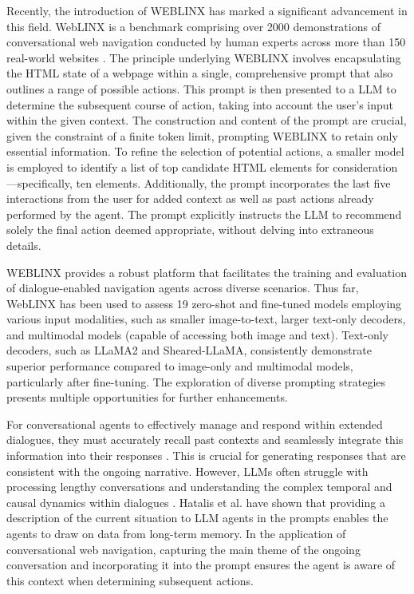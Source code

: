 \documentclass[11pt]{article}
\begin{document}
Recently, the introduction of WEBLINX \cite{lxinghan_2024_weblinx} has marked a significant advancement in this field. WebLINX is a benchmark comprising over 2000 demonstrations of conversational web navigation conducted by human experts across more than 150 real-world websites \cite{lxinghan_2024_weblinx}. The principle underlying WEBLINX involves encapsulating the HTML state of a webpage within a single, comprehensive prompt that also outlines a range of possible actions. This prompt is then presented to a LLM to determine the subsequent course of action, taking into account the user's input within the given context. The construction and content of the prompt are crucial, given the constraint of a finite token limit, prompting WEBLINX to retain only essential information. To refine the selection of potential actions, a smaller model is employed to identify a list of top candidate HTML elements for consideration—specifically, ten elements. Additionally, the prompt incorporates the last five interactions from the user for added context as well as past actions already performed by the agent. The prompt explicitly instructs the LLM to recommend solely the final action deemed appropriate, without delving into extraneous details.

WEBLINX provides a robust platform that facilitates the training and evaluation of dialogue-enabled navigation agents across diverse scenarios. Thus far, WebLINX has been used to assess 19 zero-shot and fine-tuned models employing various input modalities, such as smaller image-to-text, larger text-only decoders, and multimodal models (capable of accessing both image and text). Text-only decoders, such as LLaMA2 and Sheared-LLaMA, consistently demonstrate superior performance compared to image-only and multimodal models, particularly after fine-tuning. The exploration of diverse prompting strategies presents multiple opportunities for further enhancements.

For conversational agents to effectively manage and respond within extended dialogues, they must accurately recall past contexts and seamlessly integrate this information into their responses \cite{Evaluating_Very_Long_Term_Conversational_Memory}. This is crucial for generating responses that are consistent with the ongoing narrative. However, LLMs often struggle with processing lengthy conversations and understanding the complex temporal and causal dynamics within dialogues \cite{Evaluating_Very_Long_Term_Conversational_Memory}. Hatalis et al. \cite{hatalis_2023_memory_matters} have shown that providing a description of the current situation to LLM agents in the prompts enables the agents to draw on data from long-term memory. In the application of conversational web navigation, capturing the main theme of the ongoing conversation and incorporating it into the prompt ensures the agent is aware of this context when determining subsequent actions. 
\end{document}
